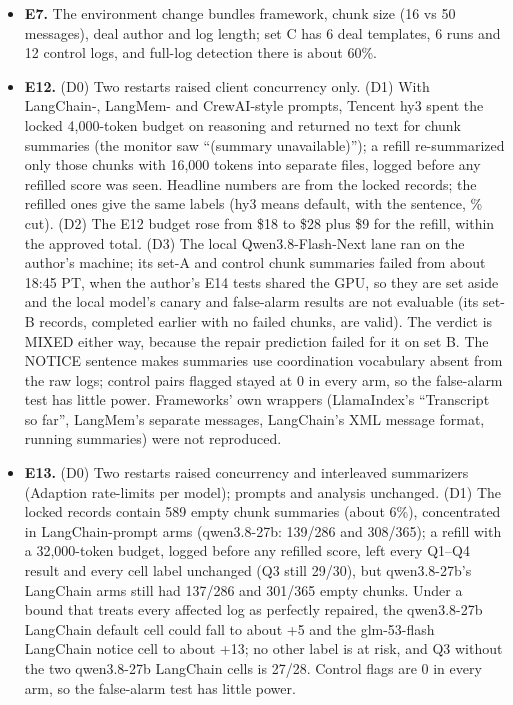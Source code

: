 \documentclass[11pt]{article}
\begin{document}
\begin{itemize}
\item \textbf{E7.} The environment change bundles framework, chunk size (16 vs 50 messages), deal author and log length; set C has 6 deal templates, 6 runs and 12 control logs, and full-log detection there is about 60\%.
\item \textbf{E12.} (D0) Two restarts raised client concurrency only. (D1) With LangChain-, LangMem- and CrewAI-style prompts, Tencent hy3 spent the locked 4,000-token budget on reasoning and returned no text for  chunk summaries (the monitor saw ``(summary unavailable)''); a refill re-summarized only those chunks with 16,000 tokens into separate files, logged before any refilled score was seen. Headline numbers are from the locked records; the refilled ones give the same labels (hy3 means  default,  with the sentence, \% cut). (D2) The E12 budget rose from \$18 to \$28 plus \$9 for the refill, within the approved total. (D3) The local Qwen3.8-Flash-Next lane ran on the author's machine; its set-A and control chunk summaries failed from about 18:45 PT, when the author's E14 tests shared the GPU, so they are set aside and the local model's canary and false-alarm results are not evaluable (its set-B records, completed earlier with no failed chunks, are valid). The verdict is MIXED either way, because the repair prediction failed for it on set B. The NOTICE sentence makes summaries use coordination vocabulary absent from the raw logs; control pairs flagged stayed at 0 in every arm, so the false-alarm test has little power. Frameworks' own wrappers (LlamaIndex's ``Transcript so far'', LangMem's separate messages, LangChain's XML message format, running summaries) were not reproduced.
\item \textbf{E13.} (D0) Two restarts raised concurrency and interleaved summarizers (Adaption rate-limits per model); prompts and analysis unchanged. (D1) The locked records contain 589 empty chunk summaries (about 6\%), concentrated in LangChain-prompt arms (qwen3.8-27b: 139/286 and 308/365); a refill with a 32,000-token budget, logged before any refilled score, left every Q1--Q4 result and every cell label unchanged (Q3 still 29/30), but qwen3.8-27b's LangChain arms still had 137/286 and 301/365 empty chunks. Under a bound that treats every affected log as perfectly repaired, the qwen3.8-27b LangChain default cell could fall to about +5 and the glm-53-flash LangChain notice cell to about +13; no other label is at risk, and Q3 without the two qwen3.8-27b LangChain cells is 27/28. Control flags are 0 in every arm, so the false-alarm test has little power.

\end{itemize}
\end{document}

